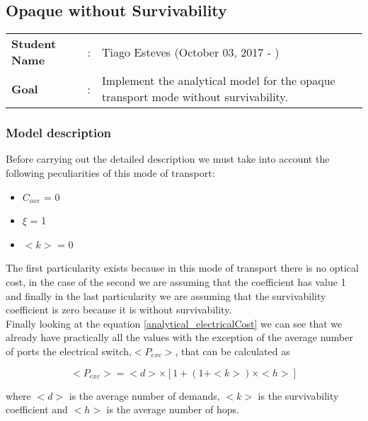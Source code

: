 \clearpage

\subsection{Opaque without Survivability}\label{analytical_Opaque_Survivability}
\begin{tcolorbox}	
\begin{tabular}{p{2.75cm} p{0.2cm} p{10.5cm}} 	
\textbf{Student Name}  &:& Tiago Esteves    (October 03, 2017 - )\\
\textbf{Goal}          &:& Implement the analytical model for the opaque transport mode without survivability.
\end{tabular}
\end{tcolorbox}

\subsubsection{Model description}

Before carrying out the detailed description we must take into account the following peculiarities of this mode of transport:
\begin{itemize}
  \item $C_{oxc}$ = 0
  \item $\xi$ = 1
  \item $<k>$ = 0
\end{itemize}

\vspace{11pt}
The first particularity exists because in this mode of transport there is no optical cost, in the case of the second we are assuming that the coefficient has value 1 and finally in the last particularity we are assuming that the survivability coefficient is zero because it is without survivability.\\

Finally looking at the equation \ref{analytical_electricalCost} we can see that we already have practically all the values with the exception of the average number of ports the electrical switch,$<P_{exc}>$, that can be calculated as

\begin{equation}
<P_{exc}> = <d> \times [1 + \left(1 + <k>\right) \times <h>]
\label{Pexc_opaque}
\end{equation}
\vspace{11pt}

\noindent
where $<d>$ is the average number of demands, $<k>$	is the survivability coefficient and $<h>$ is the average number of hops.\\

